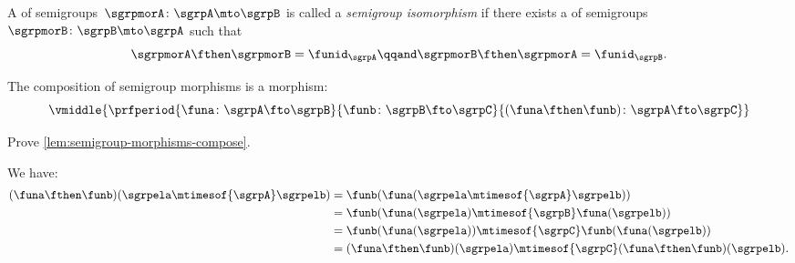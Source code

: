 \begin{ctdefinition}
    \label{def:semigroup-iso}
    A \whomo of semigroups~$\sgrpmorA\colon \sgrpA \mto \sgrpB$ is called a \emph{semigroup isomorphism} if there exists a \whomo of semigroups~$\sgrpmorB\colon \sgrpB \mto \sgrpA$ such that
    \begin{equation}
        \label{eq:sgrp-iso-cond}
        \sgrpmorA \fthen \sgrpmorB = \funid_\sgrpA
        \qqand
        \sgrpmorB \fthen \sgrpmorA = \funid_\sgrpB.
    \end{equation}
\end{ctdefinition}

\begin{lemma}
    \label{lem:semigroup-morphisms-compose}
    The composition of semigroup morphisms is a morphism:
    \begin{equation}
        \label{eq:sgrp-mor-compo}
        \vmiddle{
            \prfperiod{
                \funa  \colon \sgrpA \fto \sgrpB
            }{
                \funb \colon  \sgrpB \fto \sgrpC
            }{
                (\funa \fthen \funb)  \colon \sgrpA \fto \sgrpC
            }
        }
    \end{equation}
\end{lemma}

\begin{exercise}
    Prove \cref{lem:semigroup-morphisms-compose}.
\end{exercise}
\begin{solution}
    We have:
    \begin{equation}
        \begin{aligned}
            (\funa \fthen \funb)(\sgrpela \mtimesof{\sgrpA} \sgrpelb)
             & =\funb(\funa(\sgrpela \mtimesof{\sgrpA} \sgrpelb)) \\
             & =\funb(\funa(\sgrpela)\mtimesof{\sgrpB}\funa(\sgrpelb)) \\
             & =\funb(\funa(\sgrpela))\mtimesof{\sgrpC} \funb(\funa(\sgrpelb)) \\
             & =(\funa \fthen \funb)(\sgrpela) \mtimesof{\sgrpC} (\funa \fthen \funb)(\sgrpelb).
        \end{aligned}
    \end{equation}
\end{solution}
\showslides{
    \begin{forslides}
        \begin{equation}
            \label{eq:sgrp-posreals-mult}
            \tup{\posReals, \cdot}
        \end{equation}
        \begin{equation}
            \label{eq:sgrp-reals-plus}
            \tup{\reals, +}
        \end{equation}
    \end{forslides}
}%

